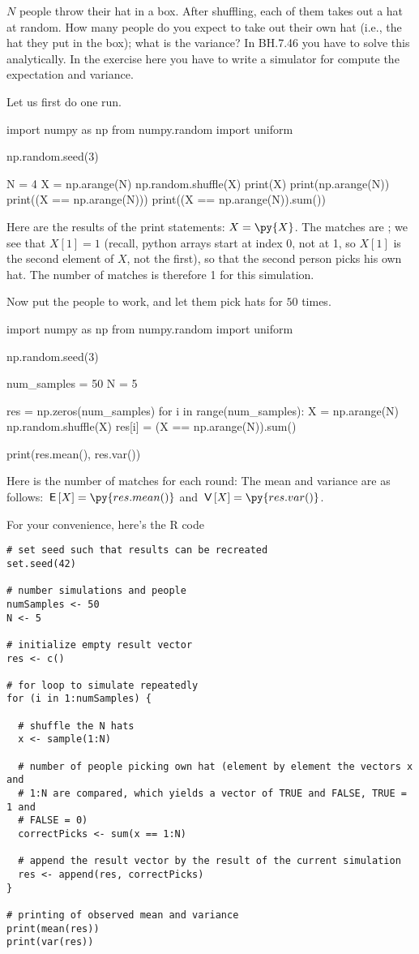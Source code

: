 \begin{exercise}
$N$ people throw their hat in a box. After shuffling, each of them takes out a hat at random. How many people do you expect to take out their own hat (i.e., the hat they put in the box); what is the variance? In BH.7.46 you have to solve this analytically. In the exercise here you have to write a simulator for compute the expectation and variance.
\begin{solution}
Let us first do one run.
\begin{pyblock}[][numbers=left,frame=lines]
import numpy as np
from numpy.random import uniform

np.random.seed(3)

N = 4
X = np.arange(N)
np.random.shuffle(X)
print(X)
print(np.arange(N))
print((X == np.arange(N)))
print((X == np.arange(N)).sum())
\end{pyblock}
Here are the results of the print statements: $X = \py{X}$. The matches are ; we see that $X[1] = 1$ (recall, python arrays start at index 0, not at 1, so $X[1]$ is the second element of $X$, not the first), so that the second person picks his own hat. The number of matches is therefore 1 for this simulation.

Now put the people to work, and let them pick hats for $50$ times.
\begin{pyblock}[][numbers=left,frame=lines]
import numpy as np
from numpy.random import uniform

np.random.seed(3)

num_samples = 50
N = 5

res = np.zeros(num_samples)
for i in range(num_samples):
    X = np.arange(N)
    np.random.shuffle(X)
    res[i] = (X == np.arange(N)).sum()

print(res.mean(), res.var())
\end{pyblock}
Here is the number of matches for each round: 
The mean and variance are as follows: $\E X = \py{res.mean()}$ and $\V X = \py{res.var()}$.

For your convenience, here's the R code
\begin{verbatim}
# set seed such that results can be recreated
set.seed(42)

# number simulations and people
numSamples <- 50
N <- 5

# initialize empty result vector
res <- c()

# for loop to simulate repeatedly
for (i in 1:numSamples) {

  # shuffle the N hats
  x <- sample(1:N)

  # number of people picking own hat (element by element the vectors x and
  # 1:N are compared, which yields a vector of TRUE and FALSE, TRUE = 1 and
  # FALSE = 0)
  correctPicks <- sum(x == 1:N)

  # append the result vector by the result of the current simulation
  res <- append(res, correctPicks)
}

# printing of observed mean and variance
print(mean(res))
print(var(res))
\end{verbatim}


\end{solution}
\end{exercise}

